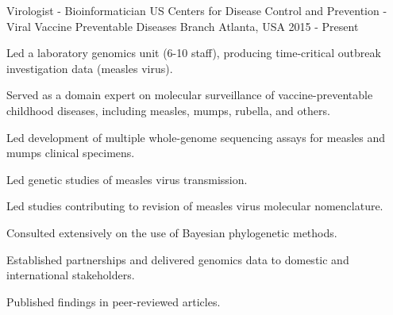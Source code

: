 

\begin{cventries}
  \vspace{-4.0mm}
  \cventry
    {Virologist - Bioinformatician} %
    {US Centers for Disease Control and Prevention - Viral Vaccine Preventable Diseases Branch} %
    {Atlanta, USA} %
    {2015 - Present} %
    {
      \begin{cvitems} %
      	\item {Led a laboratory genomics unit (6-10 staff), producing time-critical outbreak investigation data (measles virus).}
        \item {Served as a domain expert on molecular surveillance of vaccine-preventable childhood diseases, including measles, mumps, rubella, and others.}
        	\item {Led development of multiple whole-genome sequencing assays for measles and mumps clinical specimens.}
	\item {Led genetic studies of measles virus transmission.}
	\item {Led studies contributing to revision of measles virus molecular nomenclature.}
	\item {Consulted extensively on the use of Bayesian phylogenetic methods.}
	 \item {Established partnerships and delivered genomics data to domestic and international stakeholders.}
	 \item {Published findings in peer-reviewed articles.}
      \end{cvitems}
    }
  \vspace{2.0mm}
  

\end{cventries}
